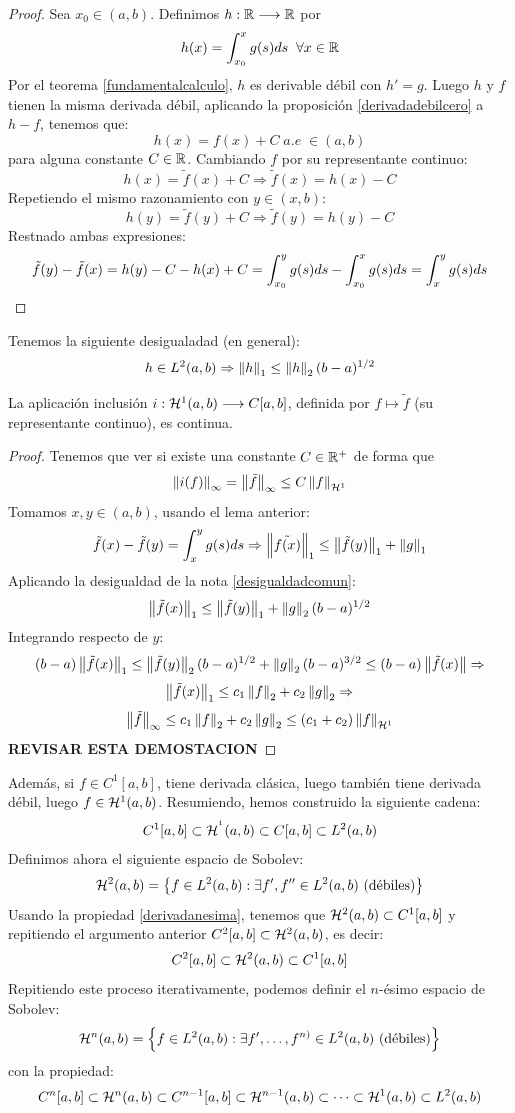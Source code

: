 \begin{proof}
Sea $x_0\in(a,b)$. Definimos $\funcion{h}{\R}{\R}$ por 
\[h(x)=\integral{x_0}{x}{g(s)ds} \;\;\forall x\in\R\] 
Por el teorema \ref{fundamentalcalculo}, $h$ es derivable débil con $h'=g$. Luego $h$ y $f$ tienen la misma derivada débil, aplicando la proposición \ref{derivadadebilcero} a $h-f$, tenemos que:
\[
h(x)=f(x)+C \;a.e \;\in(a,b)
\]
para alguna constante $C\in\R$. Cambiando $f$ por su representante continuo:
\[
h(x)=\tilde{f}(x)+C \Rightarrow \tilde{f}(x)=h(x)-C
\]
Repetiendo el mismo razonamiento con $y\in(x,b)$:
\[
h(y)=\tilde{f}(y)+C \Rightarrow \tilde{f}(y)=h(y)-C
\]
Restnado ambas expresiones:
\[
\tilde{f}(y)-\tilde{f}(x)=h(y)-C-h(x)+C=\integral{x_0}{y}{g(s)ds}-\integral{x_0}{x}{g(s)ds}=\integral{x}{y}{g(s)ds}
\]
\end{proof}
\begin{remark}
\label{desigualdadcomun}
Tenemos la siguiente desigualadad (en general):
\[
h\in\lebesgue{2} \Rightarrow \norm{h}_1\leq \norm{h}_2(b-a)^{1/2}
\]
\end{remark}
\begin{prop}\label{inclusion continua}
La aplicación inclusión $\funcion{i}{\sobolev{1}}{C[a,b]}$, definida por $f\mapsto\tilde{f}$ (su representante continuo), es continua.
\end{prop}
\begin{proof}
Tenemos que ver si existe una constante $C\in\R^+$ de forma que
\[
\norm{i(f)}_{\infty}=\norm{\tilde{f}}_\infty\leq C\normasobolev{1}{f}
\]
Tomamos $x,y\in(a,b)$, usando el lema anterior:
\[
\tilde{f}(x)-\tilde{f}(y)=\integral{x}{y}{g(s)ds} \Rightarrow \norm{\tilde{f(x)}}_1\leq\norm{\tilde{f}(y)}_1+\norm{g}_1
\]
Aplicando la desigualdad de la nota \ref{desigualdadcomun}:
\[
\norm{\tilde{f}(x)}_1\leq \norm{\tilde{f}(y)}_1+\norm{g}_2(b-a)^{1/2}
\]
Integrando respecto de $y$:
\[
(b-a)\norm{\tilde{f}(x)}_1\leq \norm{\tilde{f}(y)}_2(b-a)^{1/2}+\norm{g}_2(b-a)^{3/2}
\leq (b-a)\norm{\tilde{f}(x)} \Rightarrow
\]
\[
\norm{\tilde{f}(x)}_1\leq c_1\norm{f}_2+c_2\norm{g}_2 \Rightarrow
\]
\[
\norm{\tilde{f}}_\infty\leq c_1\norm{f}_2+c_2\norm{g}_2 \leq (c_1+c_2)\normasobolev{1}{f}
\]
\textbf{REVISAR ESTA DEMOSTACION}
\end{proof}
Además, si $f\in C^1[a,b]$, tiene derivada clásica, luego también tiene derivada débil, luego $f\in\sobolev{1}$. Resumiendo, hemos construido la siguiente cadena:
\[
C^1[a,b]\subset\sobolev{^1}\subset C[a,b]\subset \lebesgue{2}
\]
Definimos ahora el siguiente espacio de Sobolev:
\[
\sobolev{2}=\conjunto{f\in\lebesgue{2}: \exists f',f''\in\lebesgue{2}\text{ (débiles)}}
\]
Usando la propiedad \ref{derivadanesima}, tenemos que $\sobolev{2}\subset C^1[a,b]$ y repitiendo el argumento anterior $C^2[a,b]\subset \sobolev{2}$, es decir:
\[
C^2[a,b]\subset \sobolev{2}\subset C^1[a,b]
\]
Repitiendo este proceso iterativamente, podemos definir el $n$-ésimo espacio de Sobolev:
\[
\sobolev{n}=\conjunto{f\in\lebesgue{2}: \exists f',\dots,f^{n)}\in\lebesgue{2} \text{ (débiles)}}
\]
con la propiedad:
\[
C^{n}[a,b]\subset\sobolev{n}\subset C^{n-1}[a,b]\subset\sobolev{n-1}\subset\dots\subset\sobolev{1}\subset\lebesgue{2}
\]

